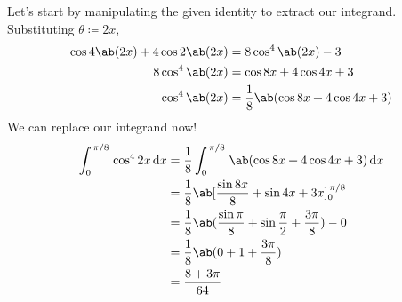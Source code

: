 Let's start by manipulating the given identity to extract our integrand.
Substituting \(\theta \coloneq 2x\),
\begin{align*}
	\cos 4\ab(2x) + 4 \cos 2\ab(2x) & = 8 \cos^4 \ab(2x) - 3                    \\
	8 \cos^4 \ab(2x)                & = \cos 8x + 4\cos 4x + 3                  \\
	\cos^4 \ab(2x)                  & = \frac{1}{8} \ab(\cos 8x + 4\cos 4x + 3)
\end{align*}
We can replace our integrand now!
\begin{align*}
	\int_{0}^{\cf{\pi}{8}} \cos^4 2x \odif{x} & = \frac{1}{8} \int_0^{\cf{\pi}{8}} \ab(\cos 8x + 4\cos 4x + 3) \odif{x}       \\
	                                          & = \frac{1}{8} \ab[\frac{\sin 8x}{8} + \sin 4x + 3x]^{\cf{\pi}{8}}_0           \\
	                                          & = \frac{1}{8} \ab(\frac{\sin\pi}{8} + \sin\frac{\pi}{2} + \frac{3\pi}{8}) - 0 \\
	                                          & = \frac{1}{8} \ab(0 + 1 + \frac{3\pi}{8})                                     \\
	                                          & = \frac{8 + 3\pi}{64}
\end{align*}
